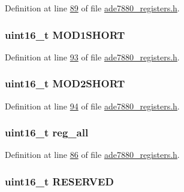 Definition at line \hyperlink{a00036_source_l00089}{89} of file \hyperlink{a00036_source}{ade7880\-\_\-registers.\-h}.

\hypertarget{a00024_a4bec96dba0eea9d340d3a75ee724ae5c}{
\subsubsection[{M\-O\-D1\-S\-H\-O\-R\-T}]{\setlength{\rightskip}{0pt plus 5cm}uint16\-\_\-t M\-O\-D1\-S\-H\-O\-R\-T}}\label{dc/de2/a00024_a4bec96dba0eea9d340d3a75ee724ae5c}


Definition at line \hyperlink{a00036_source_l00093}{93} of file \hyperlink{a00036_source}{ade7880\-\_\-registers.\-h}.

\hypertarget{a00024_a8ace21342e72e662e3ada2f540f66586}{
\subsubsection[{M\-O\-D2\-S\-H\-O\-R\-T}]{\setlength{\rightskip}{0pt plus 5cm}uint16\-\_\-t M\-O\-D2\-S\-H\-O\-R\-T}}\label{dc/de2/a00024_a8ace21342e72e662e3ada2f540f66586}


Definition at line \hyperlink{a00036_source_l00094}{94} of file \hyperlink{a00036_source}{ade7880\-\_\-registers.\-h}.

\hypertarget{a00024_a74e4d0cc3da3b66723322f38bfb7f371}{
\subsubsection[{reg\-\_\-all}]{\setlength{\rightskip}{0pt plus 5cm}uint16\-\_\-t reg\-\_\-all}}\label{dc/de2/a00024_a74e4d0cc3da3b66723322f38bfb7f371}


Definition at line \hyperlink{a00036_source_l00086}{86} of file \hyperlink{a00036_source}{ade7880\-\_\-registers.\-h}.

\hypertarget{a00024_a9484db76faad15bb8da293c622dd2269}{
\subsubsection[{R\-E\-S\-E\-R\-V\-E\-D}]{\setlength{\rightskip}{0pt plus 5cm}uint16\-\_\-t R\-E\-S\-E\-R\-V\-E\-D}}\label{dc/de2/a00024_a9484db76faad15bb8da293c622dd2269}


